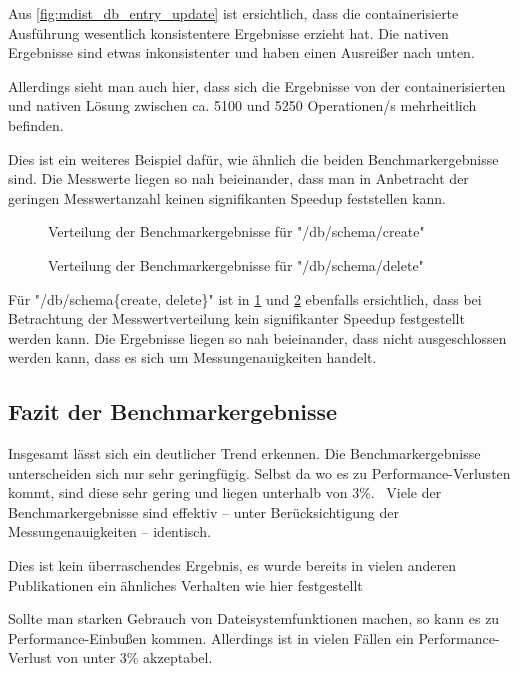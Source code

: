 \FloatBarrier

Aus \cref{fig:mdist_db_entry_update} ist ersichtlich, dass die containerisierte Ausführung wesentlich konsistentere Ergebnisse erzieht hat. 
Die nativen Ergebnisse sind etwas inkonsistenter und haben einen Ausreißer nach unten. 

Allerdings sieht man auch hier, dass sich die Ergebnisse von der containerisierten und nativen Lösung zwischen ca. 5100 und 5250 Operationen/s mehrheitlich befinden. 

Dies ist ein weiteres Beispiel dafür, wie ähnlich die beiden Benchmarkergebnisse sind. Die Messwerte liegen so nah beieinander, dass man in Anbetracht der geringen Messwertanzahl keinen signifikanten Speedup feststellen kann.

\begin{figure}[H]
    \centering
    
    \caption{Verteilung der Benchmarkergebnisse für "/db/schema/create"}
    \label{fig:mdist_db_schema_create}
\end{figure}

\begin{figure}[H]
    \centering
    
    \caption{Verteilung der Benchmarkergebnisse für "/db/schema/delete"}
    \label{fig:mdist_db_schema_delete}
\end{figure}

Für "/db/schema\{create, delete\}" ist in \cref{fig:mdist_db_schema_create} und \cref{fig:mdist_db_schema_delete} ebenfalls ersichtlich, dass bei Betrachtung der Messwertverteilung kein signifikanter Speedup festgestellt werden kann. Die Ergebnisse liegen so nah beieinander, dass nicht ausgeschlossen werden kann, dass es sich um Messungenauigkeiten handelt.

\FloatBarrier

\subsection{Fazit der Benchmarkergebnisse}

Insgesamt lässt sich ein deutlicher Trend erkennen. Die Benchmarkergebnisse unterscheiden sich nur sehr geringfügig. Selbst da wo es zu Performance-Verlusten kommt, sind diese sehr gering und liegen unterhalb von $3\%$. \
Viele der Benchmarkergebnisse sind effektiv – unter Berücksichtigung der Messungenauigkeiten – identisch.

Dies ist kein überraschendes Ergebnis, es wurde bereits in vielen anderen Publikationen ein ähnliches Verhalten wie hier festgestellt \cite[Vgl. S. 2589ff]{huExploringPerformanceSingularity2019}

Sollte man starken Gebrauch von Dateisystemfunktionen machen, so kann es zu Performance-Einbußen kommen. Allerdings ist in vielen Fällen ein Performance-Verlust von unter $3\%$ akzeptabel.